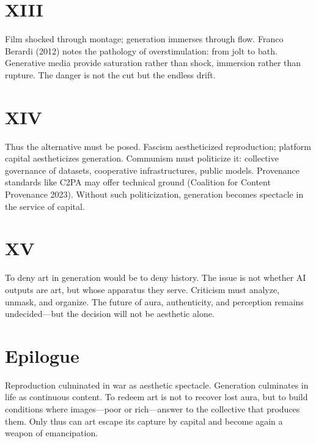 \documentclass[12pt]{article}
\begin{document}
\section*{XIII}

Film shocked through montage; generation immerses through flow. Franco Berardi (2012) notes the pathology of overstimulation: from jolt to bath. Generative media provide saturation rather than shock, immersion rather than rupture. The danger is not the cut but the endless drift.

\section*{XIV}

Thus the alternative must be posed. Fascism aestheticized reproduction; platform capital aestheticizes generation. Communism must politicize it: collective governance of datasets, cooperative infrastructures, public models. Provenance standards like C2PA may offer technical ground (Coalition for Content Provenance 2023). Without such politicization, generation becomes spectacle in the service of capital.

\section*{XV}

To deny art in generation would be to deny history. The issue is not whether AI outputs are art, but whose apparatus they serve. Criticism must analyze, unmask, and organize. The future of aura, authenticity, and perception remains undecided---but the decision will not be aesthetic alone.

\section*{Epilogue}

Reproduction culminated in war as aesthetic spectacle. Generation culminates in life as continuous content. To redeem art is not to recover lost aura, but to build conditions where images---poor or rich---answer to the collective that produces them. Only thus can art escape its capture by capital and become again a weapon of emancipation.

\printbibliography
\end{document}
